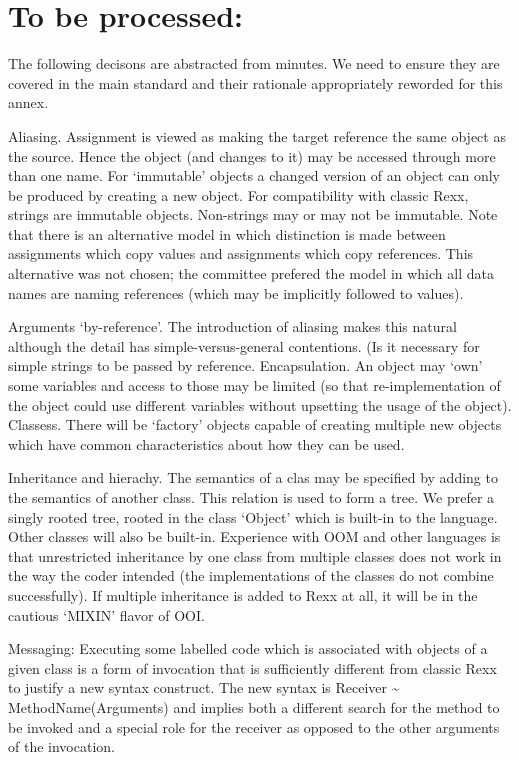 \chapter{To be processed:}\label{to-be-processed}

The following decisons are abstracted from minutes. We need to ensure
they are covered in the main standard and their rationale appropriately
reworded for this annex.

Aliasing. Assignment is viewed as making the target reference the same
object as the source. Hence the object (and changes to it) may be
accessed through more than one name. For `immutable' objects a changed
version of an object can only be produced by creating a new object. For
compatibility with classic Rexx, strings are immutable objects.
Non-strings may or may not be immutable. Note that there is an
alternative model in which distinction is made between assignments which
copy values and assignments which copy references. This alternative was
not chosen; the committee prefered the model in which all data names are
naming references (which may be implicitly followed to values).

Arguments `by-reference'. The introduction of aliasing makes this
natural although the detail has simple-versus-general contentions. (Is
it necessary for simple strings to be passed by reference.
Encapsulation. An object may `own' some variables and access to those
may be limited (so that re-implementation of the object could use
different variables without upsetting the usage of the object).
Classess. There will be `factory' objects capable of creating multiple
new objects which have common characteristics about how they can be
used.

Inheritance and hierachy. The semantics of a clas may be specified by
adding to the semantics of another class. This relation is used to form
a tree. We prefer a singly rooted tree, rooted in the class `Object'
which is built-in to the language. Other classes will also be built-in.
Experience with OOM and other languages is that unrestricted inheritance
by one class from multiple classes does not work in the way the coder
intended (the implementations of the classes do not combine
successfully). If multiple inheritance is added to Rexx at all, it will
be in the cautious `MIXIN' flavor of OOI.

Messaging: Executing some labelled code which is associated with objects
of a given class is a form of invocation that is sufficiently different
from classic Rexx to justify a new syntax construct. The new syntax is
Receiver \textasciitilde{} MethodName(Arguments) and implies both a
different search for the method to be invoked and a special role for the
receiver as opposed to the other arguments of the invocation.

